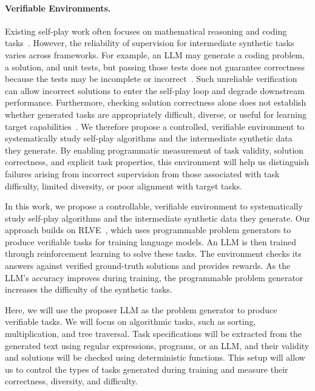 \paragraph{Verifiable Environments.}
Existing self-play work often focuses on mathematical reasoning and coding tasks~\citep{zhao2025absolute,huang2026rzero,sundaram2026teaching,bailey2026scaling}. 
However, the reliability of supervision for intermediate synthetic tasks varies across frameworks. 
For example, an LLM may generate a coding problem, a solution, and unit tests, but passing those tests does not guarantee correctness because the tests may be incomplete or incorrect~\citep{wilf2026propose}. 
Such unreliable verification can allow incorrect solutions to enter the self-play loop and degrade downstream performance. 
Furthermore, checking solution correctness alone does not establish whether generated tasks are appropriately difficult, diverse, or useful for learning target capabilities~\citep{pu2026compassplay}. 
We therefore propose a controlled, verifiable environment to systematically study self-play algorithms and the intermediate synthetic data they generate. 
By enabling programmatic measurement of task validity, solution correctness, and explicit task properties, this environment will help us distinguish failures arising from incorrect supervision from those associated with task difficulty, limited diversity, or poor alignment with target tasks.

In this work, we propose a controllable, verifiable environment to systematically study self-play algorithms and the intermediate synthetic data they generate.
Our approach builds on RLVE~\citep{zeng2025rlve}, which uses programmable problem generators to produce verifiable tasks for training language models.
An LLM is then trained through reinforcement learning to solve these tasks.
The environment checks its answers against verified ground-truth solutions and provides rewards.
As the LLM's accuracy improves during training, the programmable problem generator increases the difficulty of the synthetic tasks.

Here, we will use the proposer LLM as the problem generator to produce verifiable tasks.
We will focus on algorithmic tasks, such as sorting, multiplication, and tree traversal.
Task specifications will be extracted from the generated text using regular expressions, programs, or an LLM, and their validity and solutions will be checked using deterministic functions.
This setup will allow us to control the types of tasks generated during training and measure their correctness, diversity, and difficulty.


